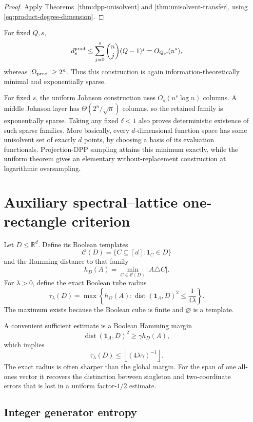 \documentclass[11pt]{article}
\theoremstyle{definition}
\theoremstyle{remark}
\newcommand{\cC}{\mathcal C}
\newcommand{\R}{\mathbb R}
\newcommand{\1}{\mathbf 1}
\newcommand{\dist}{\operatorname{dist}}
\begin{document}
\begin{proof}
Apply Theorems~\ref{thm:dpp-unisolvent} and
\ref{thm:unisolvent-transfer}, using
\eqref{eq:product-degree-dimension}.
\end{proof}

For fixed $Q,s$,
\[
 d_s^{\rm prod}
 \le\sum_{j=0}^s\binom nj(Q-1)^j
 =O_{Q,s}(n^s),
\]
whereas $|\Omega_{\rm prod}|\ge2^n$.  Thus this construction is again
information-theoretically minimal and exponentially sparse.

For fixed $s$, the uniform Johnson construction uses $O_s(n^s\log n)$
columns.  A middle Johnson layer has $\Theta(2^n/\sqrt n)$ columns, so the retained family is
exponentially sparse.  Taking any fixed $\delta<1$ also proves deterministic
existence of such sparse families.  More basically, every $d$-dimensional
function space has some unisolvent set of exactly $d$ points, by choosing a
basis of its evaluation functionals.  Projection-DPP sampling attains this
minimum exactly, while the uniform theorem gives an elementary
without-replacement construction at logarithmic oversampling.

\section{Auxiliary spectral--lattice one-rectangle criterion}

Let $D\le\R^d$.  Define its Boolean templates
\[
 \cC(D)=\{C\subseteq[d]:\1_C\in D\}
\]
and the Hamming distance to that family
\[
 h_D(A)=\min_{C\in\cC(D)}|A\triangle C|.
\]
For $\lambda>0$, define the exact Boolean tube radius
\begin{equation}\label{eq:tube-radius}
 \tau_\lambda(D)=
 \max\left\{h_D(A):
  \dist(\1_A,D)^2\le\frac1{4\lambda}\right\}.
\end{equation}
The maximum exists because the Boolean cube is finite and $\varnothing$ is a
template.

A convenient sufficient estimate is a Boolean Hamming margin
\begin{equation}\label{eq:boolean-margin}
 \dist(\1_A,D)^2\ge\gamma h_D(A),
\end{equation}
which implies
\[
 \tau_\lambda(D)\le\left\lfloor(4\lambda\gamma)^{-1}\right\rfloor.
\]
The exact radius is often sharper than the global margin.  For the span of
one all-ones vector it recovers the distinction between singleton and
two-coordinate errors that is lost in a uniform factor-$1/2$ estimate.

\subsection{Integer generator entropy}
\end{document}
